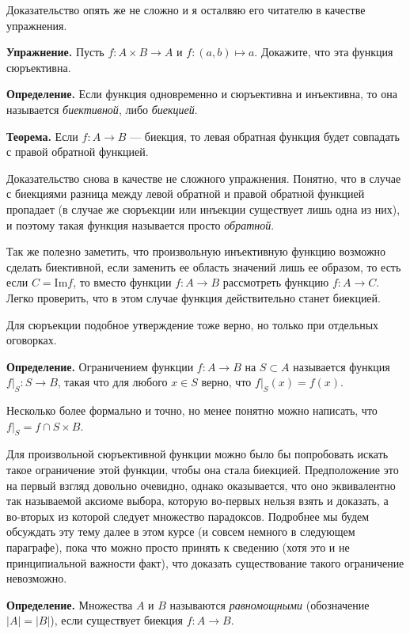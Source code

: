 Доказательство опять же не сложно и я осталвяю его читателю в качестве упражнения.

{\bfseries Упражнение.} Пусть $f:A \times B \to A$ и $f: (a, b)\mapsto a$. Докажите, что эта функция сюръективна.

{\bfseries Определение.} Если функция одновременно и сюръективна и инъективна, то она называется {\slshape биективной}, либо {\slshape биекцией}.

{\bfseries Теорема.} Если $f: A\to B$ — биекция, то левая обратная функция будет совпадать с правой обратной функцией.

Доказательство снова в качестве не сложного упражнения. Понятно, что в случае с биекциями разница между левой обратной и правой обратной функцией пропадает (в случае же сюръекции или инъекции существует лишь одна из них), и поэтому такая функция называется просто {\slshape обратной}.

Так же полезно заметить, что произвольную инъективную функцию возможно сделать биективной, если заменить ее область значений лишь ее образом, то есть если $C = \mathrm{Im} f$, то вместо функции $f: A\to B$ рассмотреть функцию $f: A \to C$. Легко проверить, что в этом случае функция действительно станет биекцией.

Для сюръекции подобное утверждение тоже верно, но только при отдельных оговорках.

{\bfseries Определение.} Ограничением функции $f: A\to B$ на $S\subset A$ называется функция $f|_S: S\to B$, такая что для любого $x\in S$ верно, что $f|_S(x) = f(x)$.

Несколько более формально и точно, но менее понятно можно написать, что $f|_S = f \cap S \times B$.

Для произвольной сюръективной функции можно было бы попробовать искать такое ограничение этой функции, чтобы она стала биекцией. Предположение это на первый взгляд довольно очевидно, однако оказывается, что оно эквивалентно так называемой аксиоме выбора, которую во-первых нельзя взять и доказать, а во-вторых из которой следует множество парадоксов. Подробнее мы будем обсуждать эту тему далее в этом курсе (и совсем немного в следующем параграфе), пока что можно просто принять к сведению (хотя это и не принципиальной важности факт), что доказать существование такого ограничение невозможно.

{\bfseries Определение.} Множества $A$ и $B$ называются {\slshape равномощными} (обозначение $|A| = |B|$), если существует биекция $f: A\to B$.

